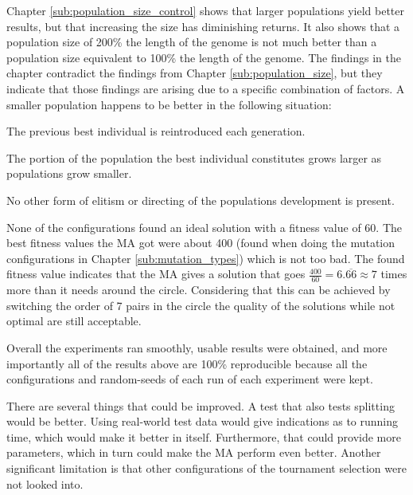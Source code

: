 Chapter \ref{sub:population_size_control} shows that larger populations yield better results, but that increasing the size has diminishing returns. It also shows that a population size of 200\% the length of the genome is not much better than a population size equivalent to 100\% the length of the genome. The findings in the chapter contradict the findings from Chapter \ref{sub:population_size}, but they indicate that those findings are arising due to a specific combination of factors. A smaller population happens to be better in the following situation:

\begin{compactitem}
    \item The previous best individual is reintroduced each generation.
    \item The portion of the population the best individual constitutes grows larger as populations grow smaller.
    \item No other form of elitism or directing of the populations development is present.
\end{compactitem}

None of the configurations found an ideal solution with a fitness value of 60. The best fitness values the MA got were about 400 (found when doing the mutation configurations in Chapter \ref{sub:mutation_types}) which is not too bad. The found fitness value indicates that the MA gives a solution that goes $\frac{400}{60} = 6.\overline{66} \approx 7$ times more than it needs around the circle. Considering that this can be achieved by switching the order of 7 pairs in the circle the quality of the solutions while not optimal are still acceptable.

Overall the experiments ran smoothly, usable results were obtained, and more importantly all of the results above are 100\% reproducible because all the configurations and random-seeds of each run of each experiment were kept.

There are several things that could be improved. A test that also tests splitting would be better. Using real-world test data would give indications as to running time, which would make it better in itself. Furthermore, that could provide more parameters, which in turn could make the MA perform even better. Another significant limitation is that other configurations of the tournament selection were not looked into.

